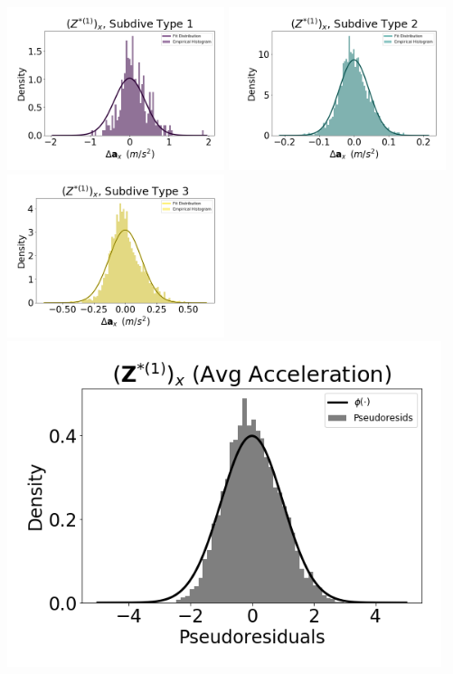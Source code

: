 \documentclass[12pt]{TD-CJS}
\begin{document}
\includegraphics[width=2.5in]{../Plots/CarHHMM1_empirical_hist_Ax_0.png}
\includegraphics[width=2.5in]{../Plots/CarHHMM1_empirical_hist_Ax_1.png}
\includegraphics[width=2.5in]{../Plots/CarHHMM1_empirical_hist_Ax_2.png}
\includegraphics[width=5in]{../Plots/CarHHMM1_psedoresids_Ax.png}
\end{document}
